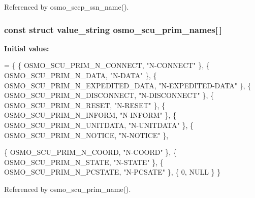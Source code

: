 Referenced by osmo\+\_\+sccp\+\_\+ssn\+\_\+name().

\subsubsection[{osmo\+\_\+scu\+\_\+prim\+\_\+names}]{\setlength{\rightskip}{0pt plus 5cm}const struct value\+\_\+string osmo\+\_\+scu\+\_\+prim\+\_\+names[$\,$]}\label{sccp__sap_8c_a3b8d62f238da526659a1a22d50db91f9}
{\bfseries Initial value\+:}
\begin{DoxyCode}
= \{
        \{ OSMO_SCU_PRIM_N_CONNECT,              \textcolor{stringliteral}{"N-CONNECT"} \},
        \{ OSMO_SCU_PRIM_N_DATA,                 \textcolor{stringliteral}{"N-DATA"} \},
        \{ OSMO_SCU_PRIM_N_EXPEDITED_DATA,       \textcolor{stringliteral}{"N-EXPEDITED-DATA"} \},
        \{ OSMO_SCU_PRIM_N_DISCONNECT,           \textcolor{stringliteral}{"N-DISCONNECT"} \},
        \{ OSMO_SCU_PRIM_N_RESET,                \textcolor{stringliteral}{"N-RESET"} \},
        \{ OSMO_SCU_PRIM_N_INFORM,               \textcolor{stringliteral}{"N-INFORM"} \},
        \{ OSMO_SCU_PRIM_N_UNITDATA,             \textcolor{stringliteral}{"N-UNITDATA"} \},
        \{ OSMO_SCU_PRIM_N_NOTICE,               \textcolor{stringliteral}{"N-NOTICE"} \},
        
        \{ OSMO_SCU_PRIM_N_COORD,                \textcolor{stringliteral}{"N-COORD"} \},
        \{ OSMO_SCU_PRIM_N_STATE,                \textcolor{stringliteral}{"N-STATE"} \},
        \{ OSMO_SCU_PRIM_N_PCSTATE,              \textcolor{stringliteral}{"N-PCSATE"} \},
        \{ 0, NULL \}
\}
\end{DoxyCode}


Referenced by osmo\+\_\+scu\+\_\+prim\+\_\+name().

